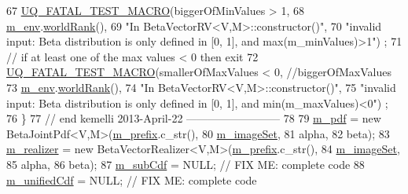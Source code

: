 \begin{DoxyCode}
67     \hyperlink{_defines_8h_a56d63d18d0a6d45757de47fcc06f574d}{UQ\_FATAL\_TEST\_MACRO}(biggerOfMinValues > 1,
68                       \hyperlink{class_q_u_e_s_o_1_1_base_vector_r_v_a556761c50e2d171977ef5f19a63c8c73}{m\_env}.\hyperlink{class_q_u_e_s_o_1_1_base_environment_a78b57112bbd0e6dd0e8afec00b40ffa7}{worldRank}(),
69                       \textcolor{stringliteral}{"In BetaVectorRV<V,M>::constructor()"},
70                       \textcolor{stringliteral}{"invalid input: Beta distribution is only defined in [0, 1], and max(m\_minValues)>1"})
      ;  
71  \textcolor{comment}{// if at least one of the max values < 0 then exit                      }
72     \hyperlink{_defines_8h_a56d63d18d0a6d45757de47fcc06f574d}{UQ\_FATAL\_TEST\_MACRO}(smallerOfMaxValues < 0, \textcolor{comment}{//biggerOfMaxValues}
73                       \hyperlink{class_q_u_e_s_o_1_1_base_vector_r_v_a556761c50e2d171977ef5f19a63c8c73}{m\_env}.\hyperlink{class_q_u_e_s_o_1_1_base_environment_a78b57112bbd0e6dd0e8afec00b40ffa7}{worldRank}(),
74                       \textcolor{stringliteral}{"In BetaVectorRV<V,M>::constructor()"},
75                       \textcolor{stringliteral}{"invalid input: Beta distribution is only defined in [0, 1], and min(m\_maxValues)<0"})
      ;                
76  \}      
77   \textcolor{comment}{// end kemelli 2013-April-22 --------------------------}
78   
79   \hyperlink{class_q_u_e_s_o_1_1_base_vector_r_v_a0ca926bca6fbcc688be6fc7496449e8e}{m\_pdf}        = \textcolor{keyword}{new} BetaJointPdf<V,M>(\hyperlink{class_q_u_e_s_o_1_1_base_vector_r_v_a030ce3bc9873a9eaf6d8bf452c096ab3}{m\_prefix}.c\_str(),
80                                               \hyperlink{class_q_u_e_s_o_1_1_base_vector_r_v_ad31872bb4da22d47528cb9d691b3b7ff}{m\_imageSet},
81                                               alpha,
82                                               beta);
83   \hyperlink{class_q_u_e_s_o_1_1_base_vector_r_v_ad99bc05293c0fd0a0accb3191fb7119e}{m\_realizer}   = \textcolor{keyword}{new} BetaVectorRealizer<V,M>(\hyperlink{class_q_u_e_s_o_1_1_base_vector_r_v_a030ce3bc9873a9eaf6d8bf452c096ab3}{m\_prefix}.c\_str(),
84                                                     \hyperlink{class_q_u_e_s_o_1_1_base_vector_r_v_ad31872bb4da22d47528cb9d691b3b7ff}{m\_imageSet},
85                                                     alpha,
86                                                     beta);
87   \hyperlink{class_q_u_e_s_o_1_1_base_vector_r_v_a1a1117671c7fa2e572a9484463bee3a5}{m\_subCdf}     = NULL; \textcolor{comment}{// FIX ME: complete code}
88   \hyperlink{class_q_u_e_s_o_1_1_base_vector_r_v_a31a1d44bbb6a7c030ca31a9577904252}{m\_unifiedCdf} = NULL; \textcolor{comment}{// FIX ME: complete code}

\end{DoxyCode}
